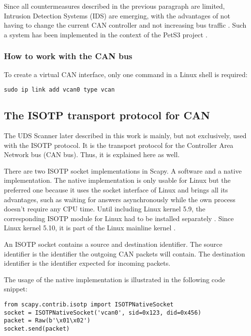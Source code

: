 Since all countermeasures described in the previous paragraph are limited, Intrusion Detection Systems (IDS) are emerging, with the advantages of not having to change the current CAN controller and not increasing bus traffic \cite{Bozdal2020}. Such a system has been implemented in the context of the PetS3 project \cite{spahn2018}.

\subsubsection{How to work with the CAN bus}


To create a virtual CAN interface, only one command in a Linux shell is required:
\begin{samepage}
\begin{verbatim}
sudo ip link add vcan0 type vcan
\end{verbatim}
\end{samepage}

\subsection{The ISOTP transport protocol for CAN}

The UDS Scanner later described in this work is mainly, but not exclusively, used with the ISOTP protocol. It is the transport protocol for the Controller Area Network bus (CAN bus). Thus, it is explained here as well.

There are two ISOTP socket implementations in Scapy. A software and a native implementation. The native implementation is only usable for Linux but the preferred one because it uses the socket interface of Linux and brings all its advantages, such as waiting for answers asynchronously while the own process doesn't require any CPU time. Until including Linux kernel 5.9, the corresponding ISOTP module for Linux had to be installed separately \cite{isotp-module}. Since Linux kernel 5.10, it is part of the Linux mainline kernel \cite{isotp-commit}.

An ISOTP socket contains a source and destination identifier. The source identifier is the identifier the outgoing CAN packets will contain. The destination identifier is the identifier expected for incoming packets.

The usage of the native implementation is illustrated in the following code snippet:

\begin{samepage}
\begin{verbatim}
from scapy.contrib.isotp import ISOTPNativeSocket
socket = ISOTPNativeSocket('vcan0', sid=0x123, did=0x456)
packet = Raw(b'\x01\x02')
socket.send(packet)
\end{verbatim}
\end{samepage}

